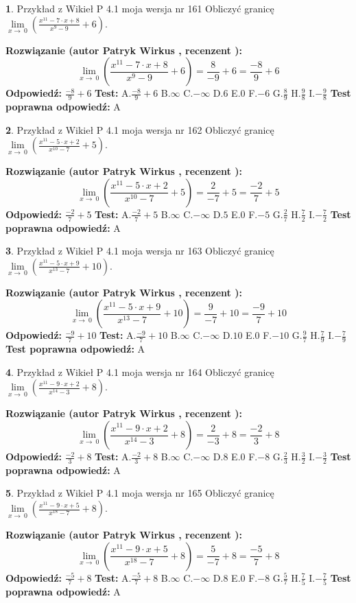 \documentclass[12pt, a4paper]{article}
\theoremstyle{definition} %
\newtheorem{zad}{}
\newcommand{\zadStart}[1]{\begin{zad}#1\newline}
\newcommand{\zadStop}{\end{zad}}
\newcommand{\rozwStart}[2]{\noindent \textbf{Rozwiązanie (autor #1 , recenzent #2): }\newline}
\newcommand{\rozwStop}{\newline}
\newcommand{\odpStart}{\noindent \textbf{Odpowiedź:}\newline}
\newcommand{\odpStop}{\newline}
\newcommand{\testStart}{\noindent \textbf{Test:}\newline}
\newcommand{\testStop}{\newline}
\newcommand{\kluczStart}{\noindent \textbf{Test poprawna odpowiedź:}\newline}
\newcommand{\kluczStop}{\newline}
\begin{document}
\zadStart{Przykład z Wikieł P 4.1 moja wersja nr 161}
Obliczyć granicę $\lim\limits_{x\to\ 0}(\frac{x^{11}-7 \cdot x +8}{x^{9}-9}+6)$.
\zadStop
\rozwStart{Patryk Wirkus}{}
$$\lim\limits_{x\to\ 0}(\frac{x^{11}-7 \cdot x +8}{x^{9}-9}+6)=\frac{8}{-9}+6=\frac{-8}{9}+6$$
\rozwStop
\odpStart
$\frac{-8}{9}+6$
\odpStop
\testStart
A.$\frac{-8}{9}+6$
B.$\infty$
C.$-\infty$
D.$6$
E.$0$
F.$-6$
G.$\frac{8}{9}$
H.$\frac{9}{8}$
I.$-\frac{9}{8}$
\testStop
\kluczStart
A
\kluczStop



\zadStart{Przykład z Wikieł P 4.1 moja wersja nr 162}
Obliczyć granicę $\lim\limits_{x\to\ 0}(\frac{x^{11}-5 \cdot x +2}{x^{10}-7}+5)$.
\zadStop
\rozwStart{Patryk Wirkus}{}
$$\lim\limits_{x\to\ 0}(\frac{x^{11}-5 \cdot x +2}{x^{10}-7}+5)=\frac{2}{-7}+5=\frac{-2}{7}+5$$
\rozwStop
\odpStart
$\frac{-2}{7}+5$
\odpStop
\testStart
A.$\frac{-2}{7}+5$
B.$\infty$
C.$-\infty$
D.$5$
E.$0$
F.$-5$
G.$\frac{2}{7}$
H.$\frac{7}{2}$
I.$-\frac{7}{2}$
\testStop
\kluczStart
A
\kluczStop



\zadStart{Przykład z Wikieł P 4.1 moja wersja nr 163}
Obliczyć granicę $\lim\limits_{x\to\ 0}(\frac{x^{11}-5 \cdot x +9}{x^{13}-7}+10)$.
\zadStop
\rozwStart{Patryk Wirkus}{}
$$\lim\limits_{x\to\ 0}(\frac{x^{11}-5 \cdot x +9}{x^{13}-7}+10)=\frac{9}{-7}+10=\frac{-9}{7}+10$$
\rozwStop
\odpStart
$\frac{-9}{7}+10$
\odpStop
\testStart
A.$\frac{-9}{7}+10$
B.$\infty$
C.$-\infty$
D.$10$
E.$0$
F.$-10$
G.$\frac{9}{7}$
H.$\frac{7}{9}$
I.$-\frac{7}{9}$
\testStop
\kluczStart
A
\kluczStop



\zadStart{Przykład z Wikieł P 4.1 moja wersja nr 164}
Obliczyć granicę $\lim\limits_{x\to\ 0}(\frac{x^{11}-9 \cdot x +2}{x^{14}-3}+8)$.
\zadStop
\rozwStart{Patryk Wirkus}{}
$$\lim\limits_{x\to\ 0}(\frac{x^{11}-9 \cdot x +2}{x^{14}-3}+8)=\frac{2}{-3}+8=\frac{-2}{3}+8$$
\rozwStop
\odpStart
$\frac{-2}{3}+8$
\odpStop
\testStart
A.$\frac{-2}{3}+8$
B.$\infty$
C.$-\infty$
D.$8$
E.$0$
F.$-8$
G.$\frac{2}{3}$
H.$\frac{3}{2}$
I.$-\frac{3}{2}$
\testStop
\kluczStart
A
\kluczStop



\zadStart{Przykład z Wikieł P 4.1 moja wersja nr 165}
Obliczyć granicę $\lim\limits_{x\to\ 0}(\frac{x^{11}-9 \cdot x +5}{x^{18}-7}+8)$.
\zadStop
\rozwStart{Patryk Wirkus}{}
$$\lim\limits_{x\to\ 0}(\frac{x^{11}-9 \cdot x +5}{x^{18}-7}+8)=\frac{5}{-7}+8=\frac{-5}{7}+8$$
\rozwStop
\odpStart
$\frac{-5}{7}+8$
\odpStop
\testStart
A.$\frac{-5}{7}+8$
B.$\infty$
C.$-\infty$
D.$8$
E.$0$
F.$-8$
G.$\frac{5}{7}$
H.$\frac{7}{5}$
I.$-\frac{7}{5}$
\testStop
\kluczStart
A
\kluczStop
\end{document}
